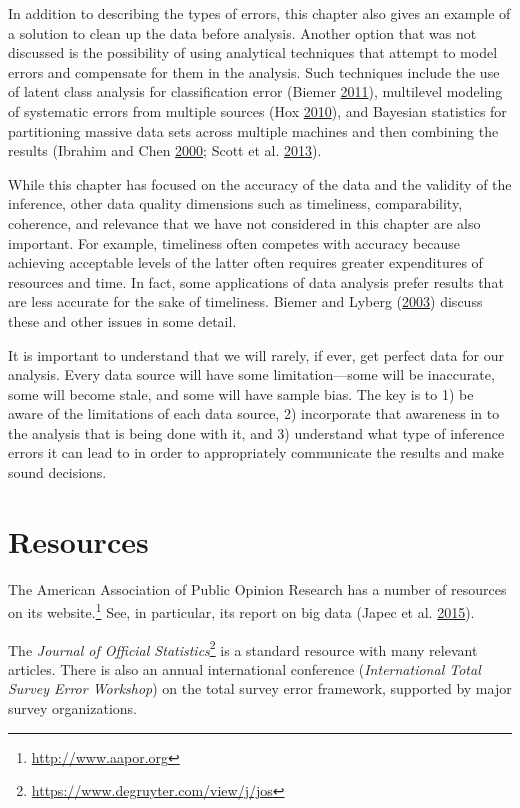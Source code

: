 \documentclass[]{krantz}
\begin{document}
In addition to describing the types of errors, this chapter also gives
an example of a solution to clean up the data before analysis. Another
option that was not discussed is the possibility of using analytical
techniques that attempt to model errors and compensate for them in the
analysis. Such techniques include the use of latent class analysis for
classification error (Biemer
\protect\hyperlink{ref-biemer2011latent}{2011}), multilevel modeling of
systematic errors from multiple sources (Hox
\protect\hyperlink{ref-hox2010multilevel}{2010}), and Bayesian
statistics for partitioning massive data sets across multiple machines
and then combining the results (Ibrahim and Chen
\protect\hyperlink{ref-ibrahim2000power}{2000}; Scott et al.
\protect\hyperlink{ref-scott2013bayes}{2013}).

While this chapter has focused on the accuracy of the data and the
validity of the inference, other data quality dimensions such as
timeliness, comparability, coherence, and relevance that we have not
considered in this chapter are also important. For example, timeliness
often competes with accuracy because achieving acceptable levels of the
latter often requires greater expenditures of resources and time. In
fact, some applications of data analysis prefer results that are less
accurate for the sake of timeliness. Biemer and Lyberg
(\protect\hyperlink{ref-biemer2003}{2003}) discuss these and other
issues in some detail.

It is important to understand that we will rarely, if ever, get perfect
data for our analysis. Every data source will have some
limitation---some will be inaccurate, some will become stale, and some
will have sample bias. The key is to 1) be aware of the limitations of
each data source, 2) incorporate that awareness in to the analysis that
is being done with it, and 3) understand what type of inference errors
it can lead to in order to appropriately communicate the results and
make sound decisions.

\section{Resources}\label{resources-5}

The American Association of Public Opinion Research has a number of
resources on its website.\footnote{\url{http://www.aapor.org}} See, in
particular, its report on big data (Japec et al.
\protect\hyperlink{ref-japec2015big}{2015}).

The \emph{Journal of Official Statistics}\footnote{\url{https://www.degruyter.com/view/j/jos}}
is a standard resource with many relevant articles. There is also an
annual international conference (\emph{International Total Survey Error
Workshop}) on the total survey error framework, supported by major
survey organizations.
\end{document}
